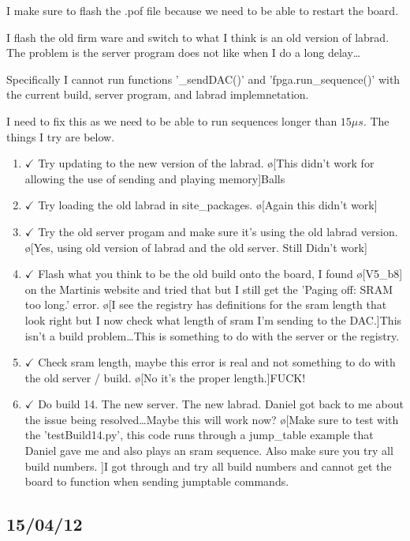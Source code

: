 \documentclass[10pt]{book}
\begin{document}
I make sure to flash the .pof file because we need to be able to restart the board.

I flash the old firm ware and switch to what I think is an old version of labrad. The problem is the server program does not like when I do a long delay\ldots

Specifically I cannot run functions '\_sendDAC()' and 'fpga.run\_sequence()' with the current build, server program, and labrad implemnetation. 

I need to fix this as we need to be able to run sequences longer than $15 \mu s$. The things I try are below.
\begin{enumerate}
    \item $\checkmark$ Try updating to the new version of the labrad. \o[This didn't work for allowing the use of sending and playing memory]{Balls}
    \item $\checkmark$ Try loading the old labrad in site_packages. \o[Again this didn't work]{}
    \item $\checkmark$ Try the old server progam and make sure it's using the old labrad version. \o[Yes, using old version of labrad and the old server. Still Didn't work]{}
    \item $\checkmark$ Flash what you think to be the old build onto the board, I found \o[V5_b8]{} on the Martinis website and tried that but I still get the 'Paging off: SRAM too long.' error. \o[I see the registry has definitions for the sram length that look right but I now check what length of sram I'm sending to the DAC.]{This isn't a build problem\ldots This is something to do with the server or the registry.}
    \item $\checkmark$ Check sram length, maybe this error is real and not something to do with the old server / build. \o[No it's the proper length.]{FUCK!}
    \item $\checkmark$ Do build 14. The new server. The new labrad. Daniel got back to me about the issue being resolved\ldots Maybe this will work now? \o[Make sure to test with the 'testBuild14.py', this code runs through a jump\_table example that Daniel gave me and also plays an sram sequence. Also make sure you try all build numbers. ]{I got through and try all build numbers and cannot get the board to function when sending jumptable commands.}
\end{enumerate}

\subsection{15/04/12}
\end{document}
